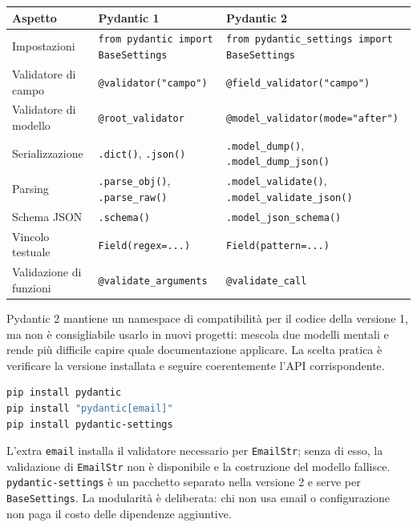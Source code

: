 \documentclass[12pt]{extarticle}
\begin{document}
\begin{center}
\small
\begin{tabular}{p{3.6cm}p{5.6cm}p{6.2cm}}
    \toprule
    \textbf{Aspetto} & \textbf{Pydantic 1} & \textbf{Pydantic 2} \\
    \midrule
    Impostazioni & \texttt{from pydantic import BaseSettings} & \texttt{from pydantic\_settings import BaseSettings} \\
    \addlinespace
    Validatore di campo & \texttt{@validator("campo")} & \texttt{@field\_validator("campo")} \\
    \addlinespace
    Validatore di modello & \texttt{@root\_validator} & \texttt{@model\_validator(mode="after")} \\
    \addlinespace
    Serializzazione & \texttt{.dict()}, \texttt{.json()} & \texttt{.model\_dump()}, \texttt{.model\_dump\_json()} \\
    \addlinespace
    Parsing & \texttt{.parse\_obj()}, \texttt{.parse\_raw()} & \texttt{.model\_validate()}, \texttt{.model\_validate\_json()} \\
    \addlinespace
    Schema JSON & \texttt{.schema()} & \texttt{.model\_json\_schema()} \\
    \addlinespace
    Vincolo testuale & \texttt{Field(regex=...)} & \texttt{Field(pattern=...)} \\
    \addlinespace
    Validazione di funzioni & \texttt{@validate\_arguments} & \texttt{@validate\_call} \\
    \bottomrule
\end{tabular}
\end{center}

\noindent Pydantic 2 mantiene un namespace di compatibilità per il codice della versione 1, ma non è consigliabile usarlo in nuovi progetti: mescola due modelli mentali e rende più difficile capire quale documentazione applicare. La scelta pratica è verificare la versione installata e seguire coerentemente l'API corrispondente.

\begin{lstlisting}[language=bash,numbers=none]
pip install pydantic
pip install "pydantic[email]"
pip install pydantic-settings
\end{lstlisting}

\noindent L'extra \texttt{email} installa il validatore necessario per \texttt{EmailStr}; senza di esso, la validazione di \texttt{EmailStr} non è disponibile e la costruzione del modello fallisce. \texttt{pydantic-settings} è un pacchetto separato nella versione 2 e serve per \texttt{BaseSettings}. La modularità è deliberata: chi non usa email o configurazione non paga il costo delle dipendenze aggiuntive.
\end{document}
